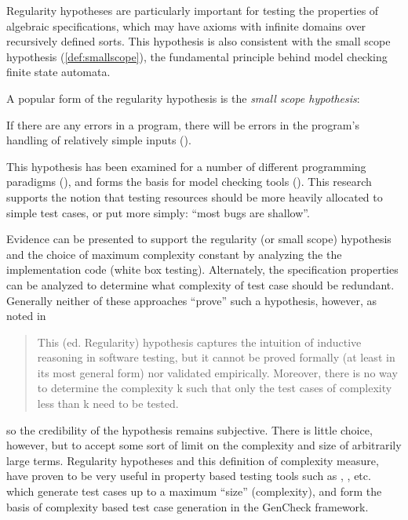 {\noindent 
Regularity hypotheses are particularly important for 
testing the properties of algebraic specifications,
which may have axioms with infinite domains over recursively defined sorts.
This hypothesis is also consistent with the small scope hypothesis (\ref{def:smallscope}), 
the fundamental principle behind model checking finite state automata.

A popular form of the regularity hypothesis is the \emph{small scope hypothesis}:
\begin{df}\label{def:smallscope}
If there are any errors in a program,
there will be errors in the program's handling of relatively simple inputs
(\cite{JacksonDamon1996}).
\end{df}
\noindent
This hypothesis has been examined for 
a number of different programming paradigms (\cite{Andoni2003}),
and forms the basis for model checking tools (\cite{ClarkePeled1999}).
This research supports the notion that
testing resources should be more heavily allocated to simple test cases,
or put more simply: ``most bugs are shallow''.

Evidence can be presented to support the regularity (or small scope) hypothesis
and the choice of maximum complexity constant
by analyzing the the implementation code (white box testing).
Alternately, the specification properties can be analyzed 
to determine what complexity of test case should be redundant.
Generally neither of these approaches  ``prove'' such a hypothesis, however,
as noted in \cite{ZhuHallMay1997} 

\begin{quote}
This (ed. Regularity) hypothesis captures the intuition of 
inductive reasoning in software testing, but it cannot be proved formally 
(at least in its most general form) nor validated empirically. 
Moreover, there is no way to determine the complexity k such
that only the test cases of complexity less than k need to be tested.
\end{quote}

\noindent so the credibility of the hypothesis remains subjective.
There is little choice, however, but to accept some sort of limit
on the complexity and size of arbitrarily large terms.
Regularity hypotheses and this definition of complexity measure, 
have proven to be very useful in property based testing tools 
such as \QC, \SC, etc. which generate test cases up to a maximum ``size'' (complexity),
and form the basis of complexity based test case generation in the GenCheck framework.

}
